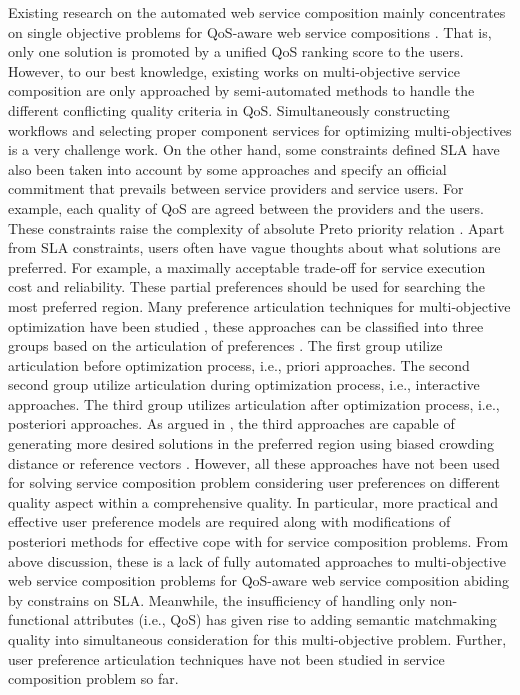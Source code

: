 Existing research on the automated web service composition mainly concentrates on single objective problems for QoS-aware web service compositions \cite{canfora2005approach,da2015graphevol,da2015gp,lecue2009optimizing,liu2007hybrid,long2009environment,ma2015hybrid,pop2009immune,rodriguez2010composition,tang2010hybrid,yu2013adaptive}. That is, only one solution is promoted by a unified QoS ranking score to the users. However, to our best knowledge, existing works on multi-objective service composition \cite{liu2005dynamic,wada2012e3,yao2009qos,yin2014hybrid} are only approached by semi-automated methods to handle the different conflicting quality criteria in QoS. Simultaneously constructing workflows and selecting proper component services for optimizing multi-objectives is a very challenge work. On the other hand, some constraints defined SLA have also been taken into account by some approaches \cite{wada2012e3,yin2014hybrid} and specify an official commitment that prevails between service providers and service users. For example, each quality of QoS are agreed between the providers and the users. These constraints raise the complexity of absolute Preto priority relation \cite{garey1979guide}. Apart from SLA constraints, users often have vague thoughts about what solutions are preferred. For example, a maximally acceptable trade-off for service execution cost and reliability. These partial preferences should be used for searching the most preferred region. Many preference articulation techniques for multi-objective optimization have been studied \cite{branke2016using,branke2005integrating,branke2001guidance,cheng2015reference,giagkiozis2014pareto}, these approaches can be classified into three groups based on the articulation of preferences \cite{van2000multiobjective}. The first group utilize articulation before optimization process, i.e., priori approaches. The second second group utilize articulation during optimization process, i.e., interactive approaches. The third group utilizes articulation after optimization process, i.e., posteriori approaches. As argued in \cite{giagkiozis2014pareto}, the third approaches are capable of generating more desired solutions in the preferred region using biased crowding distance \cite{branke2005integrating} or reference vectors \cite{cheng2015reference}. However, all these approaches have not been used for solving service composition problem considering user preferences on different quality aspect within a comprehensive quality. In particular, more practical and effective user preference models are required along with modifications of posteriori methods for effective cope with for service composition problems. From above discussion, these is a lack of fully automated approaches to multi-objective web service composition problems for QoS-aware web service composition abiding by constrains on SLA. Meanwhile, the insufficiency of handling only non-functional attributes (i.e., QoS) has given rise to adding semantic matchmaking quality into simultaneous consideration for this multi-objective problem. Further, user preference articulation techniques have not been studied in service composition problem so far.

